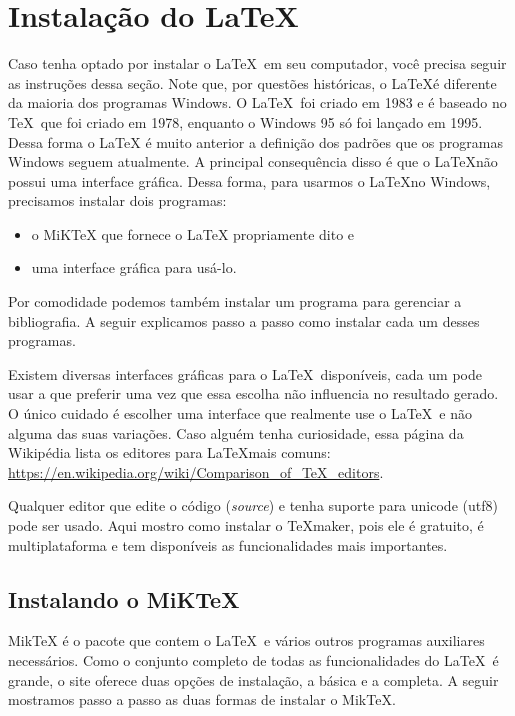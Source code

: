 \chapter{Instalação do \LaTeX}
\label{cap:instalacao}

Caso tenha optado por instalar o \LaTeX\ em seu computador, você precisa seguir as instruções dessa seção. Note que, por questões históricas, o \LaTeX é diferente da maioria dos programas Windows. O \LaTeX\ foi criado em 1983 e é baseado no \TeX\ que foi criado em 1978, enquanto o Windows 95 só foi lançado em 1995. Dessa forma o LaTeX é muito anterior a definição dos padrões que os programas Windows seguem atualmente. A principal consequência disso é que o \LaTeX não possui uma interface gráfica. Dessa forma, para usarmos o \LaTeX no Windows, precisamos instalar dois programas:

\begin{itemize}
    \item o MiKTeX que fornece o LaTeX propriamente dito e
\item uma interface gráfica para usá-lo.
\end{itemize}

Por comodidade podemos também instalar um programa para gerenciar a bibliografia. A seguir explicamos passo a passo como instalar cada um desses programas.

Existem diversas interfaces gráficas para o \LaTeX\ disponíveis, cada um pode usar a que preferir uma vez que essa escolha não influencia no resultado gerado. O único cuidado é escolher uma interface que realmente use o \LaTeX\ e não alguma das suas variações. Caso alguém tenha curiosidade, essa página da Wikipédia lista os editores para \LaTeX mais comuns: \url{https://en.wikipedia.org/wiki/Comparison\_of\_TeX\_editors}.

Qualquer editor que edite o código (\textit{source}) e tenha suporte para unicode (utf8) pode ser usado. Aqui mostro como instalar o TeXmaker, pois ele é gratuito, é multiplataforma e tem disponíveis as funcionalidades mais importantes.

\section{Instalando o MiKTeX}

MikTeX é o pacote que contem o \LaTeX\ e vários outros programas auxiliares necessários. Como o conjunto completo de todas as funcionalidades do \LaTeX\ é grande, o site oferece duas opções de instalação, a básica e a completa. A seguir mostramos passo a passo as duas formas de instalar o MikTeX.

